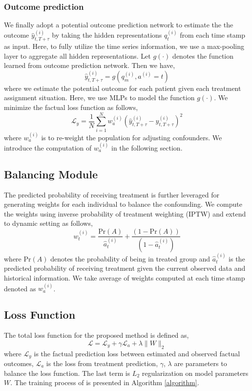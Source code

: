 \subsubsection{Outcome prediction}
We finally adopt a potential outcome prediction network to estimate the the outcome $\hat{y}^{(i)}_{t,T+\tau}$ by taking the hidden representations $q^{(i)}_{t}$ from each time stamp as input. Here, to fully utilize the time series information, we use a max-pooling layer to aggregate all hidden representations. Let $g(\cdot)$ denotes the function learned from outcome prediction network. Then we have,
\begin{equation}
\label{eq:outcome-pred}
    \hat{y}^{(i)}_{t,T+\tau}=g(q^{(i)}_{m}, a^{(i)}=t)
\end{equation}
where we estimate the potential outcome for each patient given each treatment assignment situation. Here, we use MLPs to model the function $g(\cdot)$. We minimize the factual loss function as follows,
\begin{equation}
\label{eq:outcome-pred-loss}
    \mathcal{L}_y=\frac{1}{N}\sum_{i=1}^{N}w^{(i)}_a(\hat{y}^{(i)}_{t, T+\tau}-y^{(i)}_{t, T+\tau})^{2}
\end{equation}
where $w^{(i)}_a$ is to re-weight the population for adjusting confounders. We introduce the computation of $w^{(i)}_a$ in the following section.

\subsection{Balancing Module}
The predicted probability of receiving treatment is further leveraged for generating weights for each individual to balance the confounding. We compute the weights using inverse
probability of treatment weighting (IPTW) and extend to dynamic setting as follows,
\begin{equation}
\label{eq:weighting}
w^{(i)}_t=\frac{\text{Pr}(A)}{\hat{a}^{(i)}_t}+\frac{(1-\text{Pr}(A))}{(1-\hat{a}^{(i)}_t)}  
\end{equation}
where $\text{Pr}(A)$ denotes the probability of being in treated group and $\hat{a}^{(i)}_t$ is the predicted probability of receiving treatment given the current observed data and historical information. We take average of weights computed at each time stamp denoted as $w^{(i)}_a$. 


\subsection{Loss Function}
The total loss function for the proposed method is defined as,
\begin{equation}
    \mathcal L=\mathcal{L}_y + \gamma \mathcal{L}_a + \lambda \lVert W \rVert_{2}
\end{equation}
where $\mathcal{L}_y$ is the factual prediction loss between estimated and observed factual outcomes, $\mathcal{L}_a$ is the loss from treatment prediction, $\gamma$, $\lambda$ are parameters to balance the loss function. The last term is $L_2$ regularization on model parameters $W$. The training process of \model is presented in Algorithm \ref{algorithm}.

